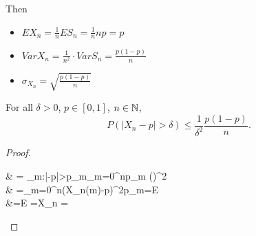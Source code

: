 \begin{exercise}
	Then
	\begin{itemize}
		\item $EX_{n}=\frac{1}{n}ES_n=\frac{1}{n}np=p$
		\item $VarX_{n}=\frac{1}{n^{2}}\cdot VarS_n= \frac{p(1-p)}{n}$
		\item $\sigma_{X_{n}}=\sqrt{\frac{p(1-p)}{n}}$
	\end{itemize}
	\begin{prop}
		For all $\delta>0$, $p \in [0,1]$, $n \in \mathbb{N}$,
		\[
			P(\left|X_n -p\right|>\delta)\le \frac{1}{\delta^2}\frac{p(1-p)}{n}
			.\]
		\begin{proof}
			\begin{flalign*}
				 & = \sum_{m:\left|-p\right|>\delta }{p_{m}}\le \sum_{m=0}^{n}{p_m \cdot \left(\right)^2} \\
				           & =\sum_{m=0}^{n}{\left(X_{n}(m)-p\right)^{2}p_m}=E     \\
						   &=E =\frac{1}{\delta^2}X_n = 
			\end{flalign*}
		\end{proof}
	\end{prop}
\end{exercise}

